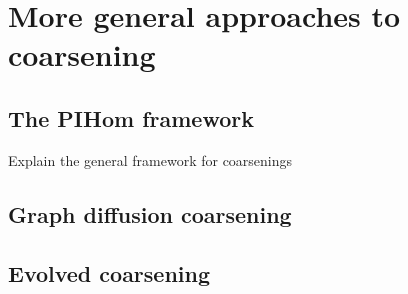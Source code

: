\section{More general approaches to coarsening}

\subsection{The PIHom framework}
Explain the general framework for coarsenings

\subsection{Graph diffusion coarsening}

\subsection{Evolved coarsening}
